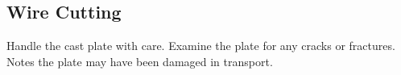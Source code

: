 \subsection{Wire Cutting}
Handle the cast plate with care. 
Examine the plate for any cracks or fractures. Notes the plate may have been damaged in transport. 